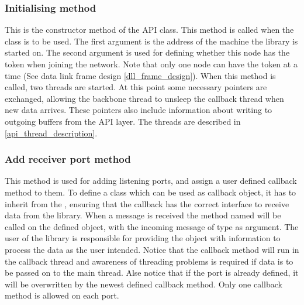 \subsubsection{Initialising method}
This is the constructor method of the API class. This method is called when the class is to be used. The first argument is the address of the machine the library is started on. The second argument is used for defining whether this node has the token when joining the network. Note that only one node can have the token at a time (See data link frame design \ref{dll_frame_design}). When this method is called, two threads are started. At this point some necessary pointers are exchanged, allowing the backbone thread to unsleep the callback thread when new data arrives. These pointers also include information about writing to outgoing buffers from the API layer. The threads are described in \ref{api_thread_description}.

\subsubsection{Add receiver port method}
This method is used for adding listening ports, and assign a user defined callback method to them. To define a class which can be used as callback object, it has to inherit from the , ensuring that the callback has the correct interface to receive data from the library. When a message is received the method named  will be called on the defined object, with the incoming message of type  as argument. The user of the library is responsible for providing the object with information to process the data as the user intended. Notice that the callback method will run in the callback thread and awareness of threading problems is required if data is to be passed on to the main thread. Alse notice that if the port is already defined, it will be overwritten by the newest defined callback method. Only one callback method is allowed on each port.


